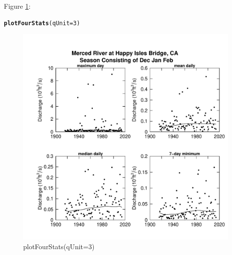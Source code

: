 \documentclass[a4paper,11pt]{article}\usepackage[]{graphicx}\usepackage[]{color}
\makeatletter
\newcommand{\hlnum}[1]{\textcolor[rgb]{0.686,0.059,0.569}{#1}}%
\newcommand{\hlstd}[1]{\textcolor[rgb]{0.345,0.345,0.345}{#1}}%
\newcommand{\hlkwc}[1]{\textcolor[rgb]{0.333,0.667,0.333}{#1}}%
\newcommand{\hlkwd}[1]{\textcolor[rgb]{0.737,0.353,0.396}{\textbf{#1}}}%
\newenvironment{kframe}{%
 \def\at@end@of@kframe{}%
 \ifinner\ifhmode%
  \def\at@end@of@kframe{\end{minipage}}%
  \begin{minipage}{\columnwidth}%
 \fi\fi%
 \def\FrameCommand##1{\hskip\@totalleftmargin \hskip-\fboxsep
 \colorbox{shadecolor}{##1}\hskip-\fboxsep
     \hskip-\linewidth \hskip-\@totalleftmargin \hskip\columnwidth}%
 \MakeFramed {\advance\hsize-\width
   \@totalleftmargin\z@ \linewidth\hsize
   \@setminipage}}%
 {\par\unskip\endMakeFramed%
 \at@end@of@kframe}
\newenvironment{knitrout}{}{} %
\makeatother
\begin{document}
Figure \ref{fig:plotFourStats}:
\begin{knitrout}
\color{fgcolor}\begin{kframe}
\begin{alltt}
\hlkwd{plotFourStats}\hlstd{(}\hlkwc{qUnit}\hlstd{=}\hlnum{3}\hlstd{)}
\end{alltt}
\end{kframe}\begin{figure}[]

\includegraphics[width=1\linewidth,height=1\linewidth]{figure/plotFourStats} \caption[plotFourStats(qUnit=3)]{plotFourStats(qUnit=3)\label{fig:plotFourStats}}
\end{figure}


\end{knitrout}

\FloatBarrier
\end{document}

